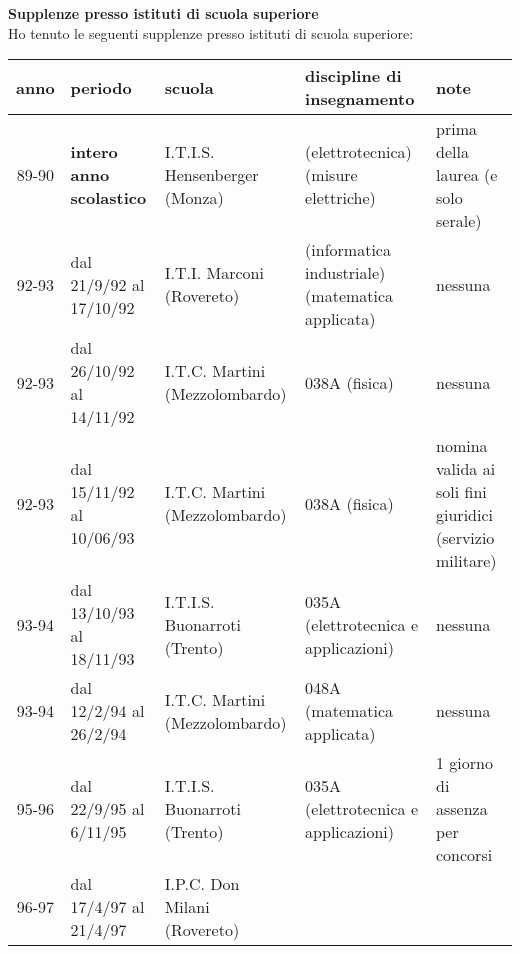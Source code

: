 \documentclass[10pt]{article}
\newcommand{\subvoice}[1] { {\large \bf #1} \smallskip\\ }
\begin{document}
\subvoice{Supplenze presso istituti di scuola superiore}
%
%
%
Ho tenuto le seguenti supplenze
presso istituti di scuola superiore:\\

\begin{center}
\begin{tabular}[c]{||c|p{0.80in}|p{1.25in}|p{1.25in}|p{1.25in}||}
 \hline \hline
  anno      & periodo & scuola & discipline di insegnamento & note\\
 \hline \hline
  89-90     & {\bf intero anno scolastico} & I.T.I.S. Hensenberger (Monza)
            & (elettrotecnica) (misure elettriche)
            & prima della laurea (e solo serale) \\
 \hline \hline
  92-93     & dal 21/9/92 al 17/10/92
            & I.T.I. Marconi (Rovereto)
            & (informatica industriale) %
              (matematica applicata) %
            & nessuna \\
  92-93     & dal 26/10/92 al 14/11/92 & I.T.C. Martini (Mezzolombardo)
            & 038A (fisica) & nessuna \\
  92-93     & dal 15/11/92 al 10/06/93 & I.T.C. Martini (Mezzolombardo)
            & 038A (fisica)
            & nomina valida ai soli fini giuridici (servizio militare) \\
 \hline \hline
  93-94     & dal 13/10/93 al 18/11/93 & I.T.I.S. Buonarroti (Trento)
            & 035A (elettrotecnica e applicazioni) & nessuna \\
  93-94     & dal 12/2/94 al 26/2/94 & I.T.C. Martini (Mezzolombardo)
            & 048A (matematica applicata) & nessuna \\
 \hline \hline
  95-96     & dal 22/9/95 al 6/11/95 & I.T.I.S. Buonarroti (Trento)
            & 035A (elettrotecnica e applicazioni) & 1 giorno di
  assenza per concorsi \\
 \hline \hline
  96-97   & dal 17/4/97 al 21/4/97 & I.P.C. Don Milani (Rovereto)

\end{tabular}
\end{center}
\end{document}
